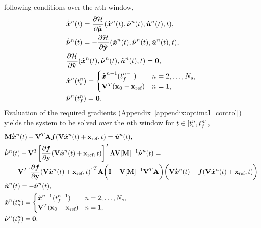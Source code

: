 following conditions over the $n$th window,
\begin{align*}%
&\genstateDotArg{n}{t} = \frac{\partial \hamiltonianArg{}}{\partial \adjointDiscreteDumArgnt{}{}}(\genstateArg{n}{t},\adjointOCArg{n}{t},\controllerArg{n}{t},t),\\%
&\adjointOCDotArg{n}{t}= - \frac{\partial \hamiltonianArg{}}{\partial \genstateyDiscreteArgnt{}{}}(\genstateArg{n}{t},\adjointOCArg{n}{t},\controllerArg{n}{t},t),\\%
&\frac{\partial \hamiltonianArg{}}{\partial \controllerDiscreteDumArgnt{}{}} (\genstateArg{n}{t},\adjointOCArg{n}{t},\controllerArg{n}{t},t) = \boldsymbol 0, \\
& \genstateArg{n}{\timeStartArg{n}} =
\begin{cases} \genstate^{n-1}(\timeEndArg{n-1} ) & n = 2,\ldots,\nslabs,
 \\ \genstateIC & n=1,\end{cases} \\
&\adjointOCArg{n}{\timeEndArg{n}}= \bz.
\end{align*}
Evaluation of the required gradients (Appendix~\ref{appendix:optimal_control}) yields the system to be solved over the $n$th window for $t \in [\timeStartArg{n},\timeEndArg{n}]$,
\begin{align}\label{eq:sys_oc1}
&\mass  \genstateDotArg{n}{t}  -  \basisspace^T \stweightingMatArgt{n}{t} \velocity(\veloargsromn) =  \controllerArg{n}{t} , \\
 & \adjointOCDotArg{n}{t}  + \basisspace^T \bigg[\frac{\partial \velocity}{\partial \stateyDiscrete} (\basisspace \genstateArg{n}{t} + \stateIntercept,t) \bigg]^T \stweightingMatArgt{n}{t} \basisspace [\massArgt{n}{t}]^{-1} \adjointOCArg{n}{t} = \nonumber \\
 & \qquad \basisspace^T \big[ \frac{\partial \velocity}{\partial \stateyDiscrete}(\basisspace \genstateArg{n}{t} + \stateIntercept,t) \big]^T \stweightingMatArgt{n}{t} \bigg( \mathbf{I} -   \basisspace [\massArgt{n}{t}]^{-1} \basisspace^T  \stweightingMatArgt{n}{t} \bigg)  \bigg( \basisspace \genstateDotArg{n}{t}  -   \velocity(\veloargsromn) \bigg) \label{eq:sys_oc2} \\
&\controllerArg{n}{t} = -\adjointOCArg{n}{t} \label{eq:sys_oc3}, \\
& \genstateArg{n}{\timeStartArg{n}} = 
\begin{cases}
 \genstate^{n-1}(\timeEndArg{n-1}) & n=2,\ldots,\nslabs, \\
\genstateIC & n=1,  
\end{cases} \label{eq:sys_oc4} \\
& \adjointOCArg{n}{\timeEndArg{n}} = \boldsymbol 0 \label{eq:sys_oc5}.
\end{align}
